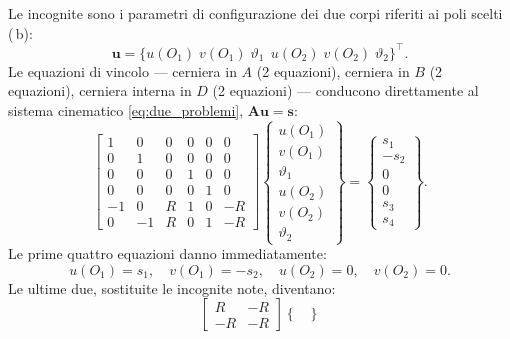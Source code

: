 \begin{esempio}
\begin{svolgimento}
		
		Le incognite sono i parametri di configurazione dei due
		corpi riferiti ai poli scelti (\,b):
		\begin{equation*}
			\bm{u} =
			\bigl\{u(O_1)\; v(O_1)\; \vartheta_1\,\;
			u(O_2)\; v(O_2)\; \vartheta_2
			\bigr\}^\top.
		\end{equation*}
		Le equazioni di vincolo --- cerniera in $A$ (2 equazioni),
		cerniera in $B$ (2 equazioni), cerniera interna in $D$
		(2 equazioni) --- conducono direttamente al sistema
		cinematico \eqref{eq:due_problemi}, $\bm{A}\bm{u} = \bm{s}$:
		\begin{equation*}
			\begin{bmatrix}
				1 & 0 &  0 & 0 & 0 &  0 \\
				0 & 1 &  0 & 0 & 0 &  0 \\
				0 & 0 &  0 & 1 & 0 &  0 \\
				0 & 0 &  0 & 0 & 1 &  0 \\
				-1 & 0 & R & 1 & 0 &  -R \\
				0 & -1 &  R & 0 & 1 & - R
			\end{bmatrix}
			\begin{Bmatrix}
				u(O_1) \\ v(O_1) \\ \vartheta_1 \\
				u(O_2) \\ v(O_2) \\ \vartheta_2
			\end{Bmatrix}
			=
			\begin{Bmatrix}
				s_1 \\ -s_2 \\ 0 \\ 0 \\ s_3 \\ s_4
			\end{Bmatrix}.
		\end{equation*}
		Le prime quattro equazioni danno immediatamente:
		\begin{equation*}
			u(O_1) = s_1, \quad
			v(O_1) = -s_2, \quad
			u(O_2) = 0, \quad
			v(O_2) = 0.
		\end{equation*}
		Le ultime due, sostituite le incognite note, diventano:
		\begin{equation*}
			\begin{bmatrix}
				R & -R \\
				-R & -R
			\end{bmatrix}
			\begin{Bmatrix}

\end{Bmatrix}
\end{equation*}
\end{svolgimento}
\end{esempio}
